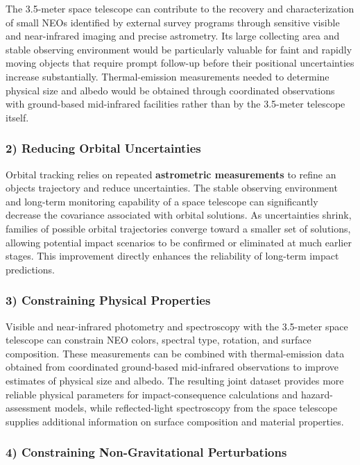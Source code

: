 The 3.5-meter space telescope can contribute to the recovery and
characterization of small NEOs identified by external survey programs
through sensitive visible and near-infrared imaging and precise astrometry.
Its large collecting area and stable observing environment would be
particularly valuable for faint and rapidly moving objects that require
prompt follow-up before their positional uncertainties increase
substantially. Thermal-emission measurements needed to determine physical
size and albedo would be obtained through coordinated observations with
ground-based mid-infrared facilities rather than by the 3.5-meter telescope
itself.

\subsubsection{2) Reducing Orbital Uncertainties}\label{reducing-orbital-uncertainties}

Orbital tracking relies on repeated \textbf{astrometric measurements} to refine an object\textquotesingle s trajectory and reduce uncertainties. The stable observing environment and long-term monitoring capability of a space telescope can significantly decrease the covariance associated with orbital solutions. As uncertainties shrink, families of possible orbital trajectories converge toward a smaller set of solutions, allowing potential impact scenarios to be confirmed or eliminated at much earlier stages. This improvement directly enhances the reliability of long-term impact predictions.

\subsubsection{3) Constraining Physical Properties}\label{constraining-physical-properties}

Visible and near-infrared photometry and spectroscopy with the 3.5-meter
space telescope can constrain NEO colors, spectral type, rotation, and
surface composition. These measurements can be combined with thermal-emission
data obtained from coordinated ground-based mid-infrared observations to
improve estimates of physical size and albedo. The resulting joint dataset
provides more reliable physical parameters for impact-consequence
calculations and hazard-assessment models, while reflected-light
spectroscopy from the space telescope supplies additional information on
surface composition and material properties.

\subsubsection{4) Constraining Non-Gravitational Perturbations}\label{constraining-non-gravitational-perturbations}

